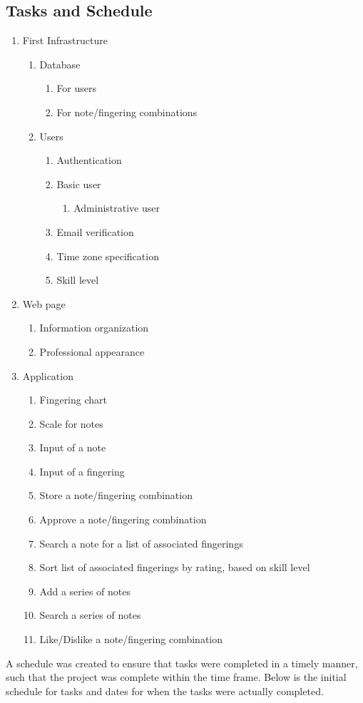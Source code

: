 \documentclass[12pt,english]{article}
\begin{document}
\subsection{Tasks and Schedule}
\begin{enumerate}
\item First Infrastructure 

\begin{enumerate}
\item Database 

\begin{enumerate}
\item For users 
\item For note/fingering combinations 
\end{enumerate}
\item Users 

\begin{enumerate}
\item Authentication 
\item Basic user 

\begin{enumerate}
\item Administrative user 
\end{enumerate}
\item Email verification 
\item Time zone specification 
\item Skill level 
\end{enumerate}
\end{enumerate}
\item Web page 

\begin{enumerate}
\item Information organization 
\item Professional appearance 
\end{enumerate}
\item Application 

\begin{enumerate}
\item Fingering chart 
\item Scale for notes 
\item Input of a note 
\item Input of a fingering 
\item Store a note/fingering combination 
\item Approve a note/fingering combination 
\item Search a note for a list of associated fingerings 
\item Sort list of associated fingerings by rating, based on skill level 
\item Add a series of notes 
\item Search a series of notes 
\item Like/Dislike a note/fingering combination 
\end{enumerate}
\end{enumerate}
A schedule was created to ensure that tasks were completed in a timely
manner, such that the project was complete within the time frame.
Below is the initial schedule for tasks and dates for when the tasks
were actually completed. 
\end{document}
